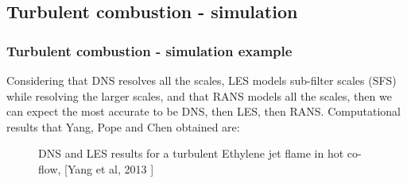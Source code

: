 \documentclass{beamer}
\begin{document}
\subsection{Turbulent combustion - simulation}
\begin{frame}%
\frametitle{Turbulent combustion - simulation example}
\scriptsize
{Considering that DNS resolves all the scales, LES models sub-filter scales (SFS) while resolving the larger scales, and that RANS models all the scales, then we can expect the most accurate to be DNS, then LES, then RANS. Computational results that Yang, Pope and Chen  obtained are:}
\vspace{-25pt}
\begin{figure}
\label{fig:DNSLES}
\centering
{}
\tiny{\caption{\tiny{DNS and LES results for a turbulent Ethylene jet flame in hot co-flow, [Yang et al, 2013 \cite{Pope}]}}}
\end{figure}
\end{frame}
\end{document}
